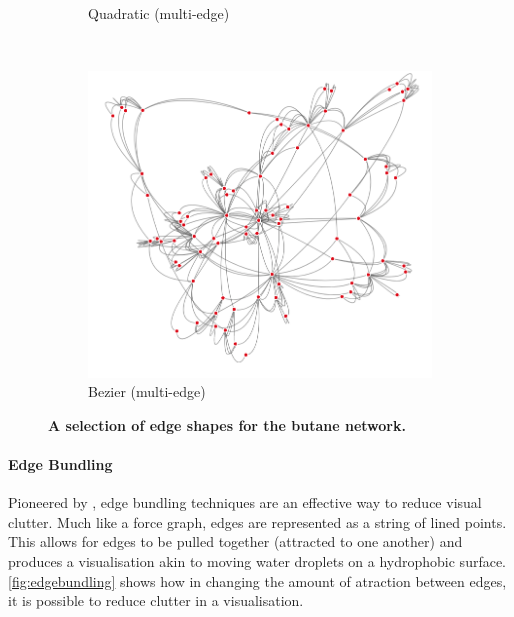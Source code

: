\begin{figure}[H]
\begin{subfigure}[b]{.32\textheight}
     \caption{Quadratic (multi-edge)}
     \end{subfigure}\\
     \begin{subfigure}[b]{.32\textheight}
         \centering
     \includegraphics[width=\textwidth]{figures_c1/edgetype/multibeziergray.png}
     \caption{Bezier (multi-edge)}
     \end{subfigure}
        \caption{\textbf{A selection of edge shapes for the butane network.}       }
      \label{fig:curvededge}
\end{figure}








\paragraph{Edge Bundling }
Pioneered by \citep{bundlepioneer}, edge bundling techniques are an effective way to reduce visual clutter. Much like a force graph, edges are represented as a string of lined points. This allows for edges to be pulled together (attracted to one another) and produces a visualisation akin to moving water droplets on a hydrophobic surface. \autoref{fig:edgebundling} shows how in changing the amount of atraction between edges, it is possible to reduce clutter in a visualisation. 


